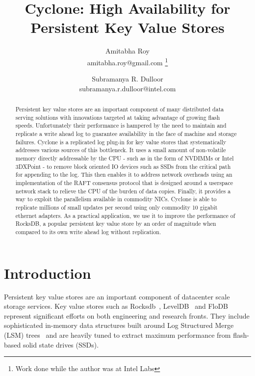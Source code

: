 \documentclass[letterpaper,twocolumn,10pt]{article}
\begin{document}
\title{Cyclone: High Availability for Persistent Key Value Stores}

\author{{\rm Amitabha Roy} \\ amitabha.roy@gmail.com \thanks{Work done while the author was at Intel Labs}
	     \and {\rm Subramanya R. Dulloor} \\ subramanya.r.dulloor@intel.com}

\date{}
\maketitle


\begin{abstract}
\vspace{0.05in}
Persistent key value stores are an important component of many
distributed data serving solutions with innovations targeted at taking
advantage of growing flash speeds. Unfortunately their performance is
hampered by the need to maintain and replicate a write ahead log to
guarantee availability in the face of machine and storage
failures. Cyclone is a replicated log plug-in for key value stores
that systematically addresses various sources of this bottleneck. It
uses a small amount of non-volatile memory directly addressable by the
CPU - such as in the form of NVDIMMs or Intel 3DXPoint - to remove
block oriented IO devices such as SSDs from the critical path for
appending to the log. This then enables it to address network
overheads using an implementation of the RAFT consensus protocol that
is designed around a userspace network stack to relieve the CPU of the
burden of data copies.  Finally, it provides a way to exploit the
parallelism available in commodity NICs.  Cyclone is able to replicate
millions of small updates per second using only commodity 10 gigabit
ethernet adapters. As a practical application, we use it to improve
the performance of RocksDB, a popular persistent key value store by an
order of magnitude when compared to its own write ahead log without
replication.
\end{abstract}

\section{Introduction}
Persistent key value stores are an important component of datacenter
scale storage services. Key value stores such as
Rocksdb~\cite{rocksdb}, LevelDB~\cite{leveldb} and FloDB~\cite{flodb}
represent significant efforts on both engineering and research
fronts. They include sophisticated in-memory data structures built
around Log Structured Merge (LSM) trees~\cite{lsmtree} and are heavily
tuned to extract maximum performance from flash-based solid state
drives (SSDs).
\end{document}
